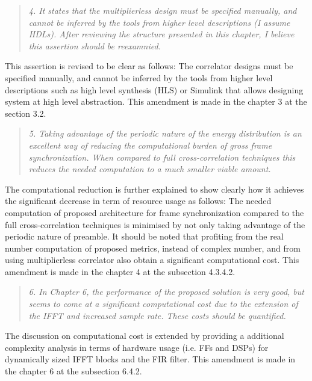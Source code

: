\documentclass{article}
\begin{document}
\begin{quote}
\emph{4. It states that the multiplierless design must be specified manually, and cannot be inferred by the tools from higher level descriptions (I assume HDLs). After reviewing the structure presented in this chapter, I believe this assertion should be reexamnied.}
\end{quote}
This assertion is revised to be clear as follows:
The correlator designs must be specified manually, and cannot be inferred by the tools from higher level descriptions such as high level synthesis (HLS) or Simulink that allows designing system at high level abstraction. 
This amendment is made in the chapter 3 at the section 3.2.

\begin{quote}
\emph{5. Taking advantage of the periodic nature of the energy distribution is an excellent way of reducing the computational burden of gross frame synchronization. When compared to full cross-correlation techniques this reduces the needed computation to a much smaller viable amount.}
\end{quote}
The computational reduction is further explained to show clearly how it achieves the significant decrease in term of resource usage as follows: 
The needed computation of proposed architecture for frame synchronization compared to the full cross-correlation techniques is minimised by not only taking advantage of the periodic nature of preamble. 
It should be noted that profiting from the real number computation of proposed metrics, instead of complex number, and from using multiplierless correlator also obtain a significant computational cost.
This amendment is made in the chapter 4 at the subsection 4.3.4.2.

\begin{quote}
\emph{6. In Chapter 6, the performance of the proposed solution is very good, but seems to come at a significant computational cost due to the extension of the IFFT and increased sample rate. These costs should be quantified.}
\end{quote}
The discussion on computational cost is extended by providing a additional complexity analysis in terms of hardware usage (i.e. FFs and DSPs) for dynamically sized IFFT blocks and the FIR filter. This amendment is made in the chapter 6 at the subsection 6.4.2.
\end{document}
